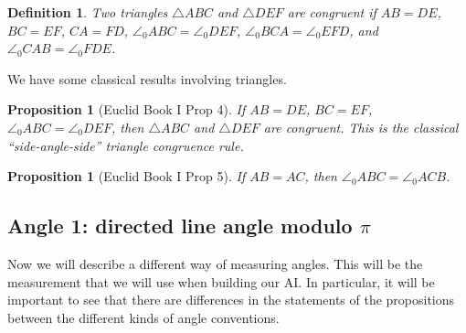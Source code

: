 \documentclass[reqno]{amsart}
\DeclareMathOperator{\1}{\textbf{1}}
\newtheorem{prop}[thm]{Proposition}
\newtheorem{defn}[thm]{Definition}
\begin{document}
\begin{defn}\label{defn: congruent triangles}
    Two triangles $\triangle ABC$ and $\triangle DEF$ are congruent if $AB =
    DE$, $BC = EF$, $CA = FD$, $\angle_0ABC = \angle_0DEF$, $\angle_0BCA =
    \angle_0EFD$, and $\angle_0CAB = \angle_0FDE$.
\end{defn}
\noindent We have some classical results involving triangles. 
\begin{prop}[Euclid Book I Prop 4]\label{prop: Euclid Book 1 Prop 4 Angle 0} 
    If $AB = DE$, $BC = EF$, $\angle_0 ABC = \angle_0DEF$, then $\triangle ABC$
    and $\triangle DEF$ are congruent. This is the classical ``side-angle-side''
    triangle congruence rule.
\end{prop}

\begin{prop}[Euclid Book I Prop 5]\label{prop: Euclid Book 1 Prop 5 Angle 0}
    If $AB = AC$, then $\angle_0ABC = \angle_0ACB$. 
\end{prop}


\subsection{Angle 1: directed line angle modulo $\pi$}

Now we will describe a different way of measuring angles. This will be the
measurement that we will use when building our AI. In particular, it will be
important to see that there are differences in the statements of the
propositions between the different kinds of angle conventions.
\end{document}
